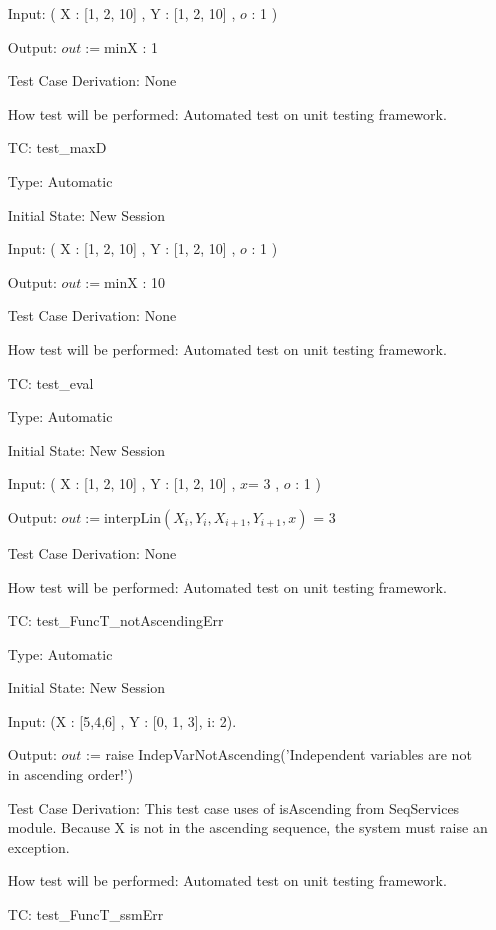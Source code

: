 \documentclass[12pt]{article}
\newcounter{utestnum} %
\begin{document}
\begin{enumerate}[label=TC\arabic*:,ref={\arabic*}]
Input: ( X : [1, 2, 10] , Y : [1, 2, 10] , $o$ : 1 )

Output: $out := \mbox{minX}$ : 1


Test Case Derivation: None

How test will be performed: Automated test on unit testing framework.

\item [TC\refstepcounter{utestnum}\theutestnum: \label{FuncTmaxDTest}] 
test\_maxD

Type: Automatic

Initial State: New Session

Input: ( X : [1, 2, 10] , Y : [1, 2, 10] , $o$ : 1 )

Output: $out := \mbox{minX}$ : 10


Test Case Derivation: None

How test will be performed: Automated test on unit testing framework.

\item [TC\refstepcounter{utestnum}\theutestnum: \label{FuncTevalDTest}] 
test\_eval

Type: Automatic

Initial State: New Session

Input: ( X : [1, 2, 10] , Y : [1, 2, 10] , $x$= 3 ,  $o$ : 1 )

Output: $out := \mbox{interpLin}(X_i, Y_i, X_{i+1}, Y_{i+1}, x)$ = 3


Test Case Derivation: None

How test will be performed: Automated test on unit testing framework.


\item [TC\refstepcounter{utestnum}\theutestnum: \label{FuncTnotAscendingErrTest}] 
test\_FuncT\_notAscendingErr

Type: Automatic

Initial State: New Session

Input: (X : [5,4,6] , Y : [0, 1, 3], i: 2).

Output: $out$ := raise IndepVarNotAscending('Independent variables are not in ascending order!')


Test Case Derivation: This test case uses of isAscending from SeqServices module. Because X is not in the ascending sequence, the system must raise an exception. 

How test will be performed: Automated test on unit testing framework.

\item [TC\refstepcounter{utestnum}\theutestnum: \label{FuncTssmErrTest}] 
test\_FuncT\_ssmErr


\end{enumerate}
\end{document}
